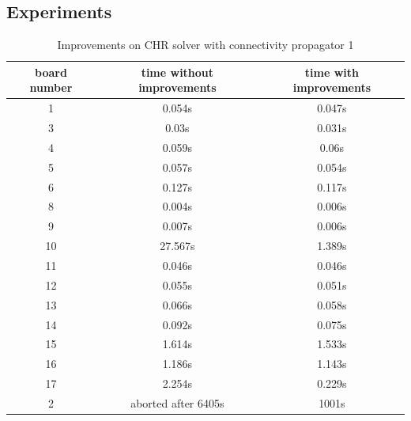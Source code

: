 \documentclass{report}
\begin{document}
\subsection{Experiments}
\begin{table}[h]
\centering
\begin{tabular}{|c|c|c|}
\hline
 board number & time without improvements &  time with improvements  \\ \hline
       1   & 0.054s & 0.047s \\
       3   & 0.03s & 0.031s \\
       4   & 0.059s & 0.06s \\
       5   & 0.057s & 0.054s \\
       6   & 0.127s & 0.117s \\
       8   & 0.004s & 0.006s \\
       9   & 0.007s & 0.006s \\
       10  & 27.567s & 1.389s \\
       11  & 0.046s & 0.046s \\
       12  & 0.055s & 0.051s \\
       13  & 0.066s & 0.058s \\
       14  & 0.092s & 0.075s \\
       15  & 1.614s & 1.533s \\
       16  & 1.186s & 1.143s \\
       17  & 2.254s & 0.229s \\
       2   & aborted after 6405s & 1001s \\
\hline
\end{tabular}
\caption{Improvements on CHR solver with connectivity propagator 1}
\end{table}
\end{document}
